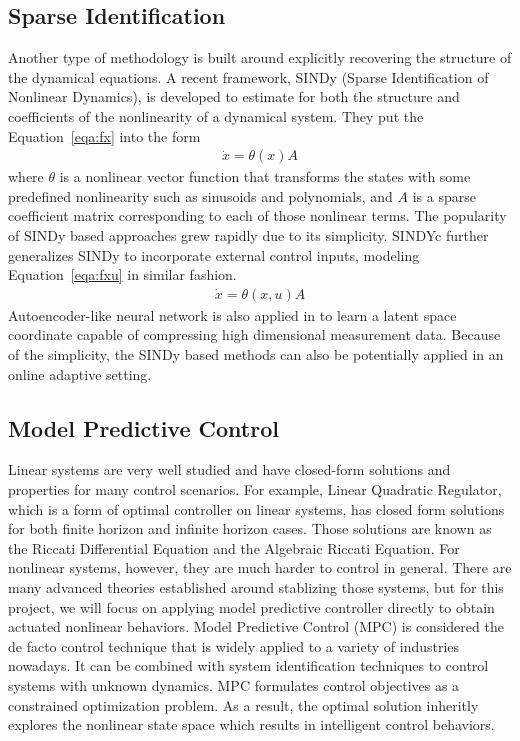 \documentclass[10pt,twocolumn]{article}
\begin{document}
\subsection{Sparse Identification}
Another type of methodology is built around explicitly recovering the structure of
the dynamical equations. A recent framework, SINDy \cite{sindy} (Sparse Identification of
Nonlinear Dynamics), is developed to estimate
for both the structure and coefficients of the nonlinearity of a dynamical system.
They put the Equation~\ref{eqa:fx} into the form
\begin{gather}\label{eqa:sindy}
  \dot{x} = \theta(x) A
\end{gather}
where $\theta$ is a nonlinear vector function that transforms the states with
some predefined nonlinearity such as sinusoids and polynomials, and $A$ is a sparse
coefficient matrix corresponding to each of those nonlinear terms. The popularity
of SINDy based approaches grew rapidly due to its simplicity. SINDYc \cite{sindyc} further
generalizes SINDy to incorporate external control inputs, modeling Equation~\ref{eqa:fxu}
in similar fashion.
\begin{gather}\label{eqa:sindyc}
  \dot{x} = \theta(x, u) A
\end{gather}
Autoencoder-like neural network is also applied in \cite{deepsindy}
to learn a latent space coordinate capable of compressing high dimensional measurement
data. Because of the simplicity, the SINDy based methods can also be potentially applied
in an online adaptive setting.

\subsection{Model Predictive Control}

Linear systems are very well studied and have closed-form solutions and properties
for many control scenarios. For example, Linear Quadratic Regulator, which is a form of
optimal controller on linear systems, has closed form solutions for both finite horizon
and infinite horizon cases. Those solutions are known as the Riccati Differential Equation
and the Algebraic Riccati Equation. For nonlinear systems, however, they are much harder to
control in general. There are many advanced
theories established around stablizing those systems, but for this project, we will
focus on applying model predictive controller directly to obtain actuated nonlinear
behaviors. Model Predictive Control (MPC) is considered the de facto control
technique that is widely applied to a variety of industries nowadays. It can be combined
with system identification techniques to control systems with unknown dynamics. MPC formulates
control objectives as a constrained optimization problem. As a result, the optimal solution
inheritly explores the nonlinear state space which results in intelligent control behaviors.
\end{document}
